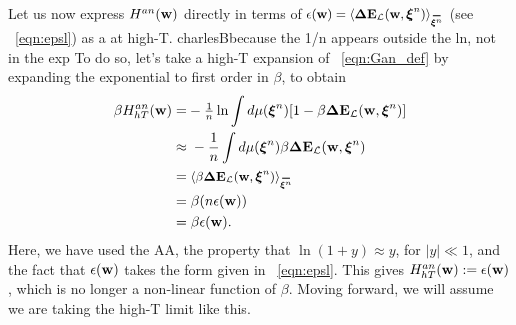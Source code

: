{%


Let us now express $H^{an}({\mathbf{w}})$ directly in terms of $\EPSLw=\langle\DETOPXI \rangle_{\AVGNDXIn}$ (see \EQN~\ref{eqn:epsl}) as a \ThermalAverage at high-T.
charlesB{because the 1/n appears outside the ln, not in the exp}
To do so, let's take a high-T expansion of \EQN~\ref{eqn:Gan_def} 
by expanding the exponential to first order in $\beta$, to obtain
\begin{align}
\label{eqn:Gan_highT}
\beta\GANHT
=&  - \tfrac{1}{n}\ln \int d\mu(\NDXIn) [1-\beta \DETOPXI] \\ \nonumber
\approx&\;   - \frac{1}{n} \int d\mu(\NDXIn)\beta \DETOPXI \\ \nonumber
=&\;\langle \beta\DETOPXI \rangle_{\AVGNDXIn} \\ \nonumber
=&\;\beta (n\EPSLw)\\ 
\label{eqn:Gan_highT_final}
=&\;\beta \EPSLw  .
\end{align}
Here, we have used the AA, the property that $\ln(1 + y) \approx y$, for $|y| \ll 1$, and the fact that $\epsilon({\mathbf{w}})$ takes the form given in \EQN~\ref{eqn:epsl}.
This gives $H^{an}_{hT}({\mathbf{w}}):=\epsilon({\mathbf{w}})$, which is no longer a non-linear function of $\beta$.
Moving forward, we will assume we are taking the high-T limit like this.

}
